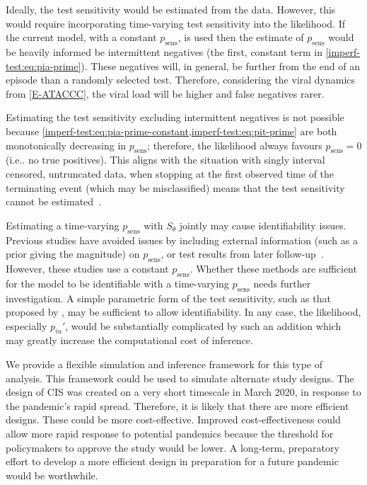 \documentclass[12pt]{article}
\makeatletter
\newcommand{\psens}{p_\text{sens}}
\DeclareRobustCommand\onedot{\futurelet\@let@token\@onedot}
\def\@onedot{\ifx\@let@token.\else.\null\fi\xspace}
\def\ie{i.e\onedot} \def\Ie{{I.e}\onedot}
\makeatother
\begin{document}
Ideally, the test sensitivity would be estimated from the data.
However, this would require incorporating time-varying test sensitivity into the likelihood.
If the current model, with a constant $\psens$, is used then the estimate of $\psens$ would be heavily informed be intermittent negatives (the first, constant term in \cref{imperf-test:eq:pia-prime}).
These negatives will, in general, be further from the end of an episode than a randomly selected test.
Therefore, considering the viral dynamics from \cref{E-ATACCC}, the viral load will be higher and false negatives rarer.

Estimating the test sensitivity excluding intermittent negatives is not possible because \cref{imperf-test:eq:pia-prime-constant,imperf-test:eq:pit-prime} are both monotonically decreasing in $\psens$; therefore, the likelihood always favours $\psens = 0$ (\ie no true positives).
This aligns with the situation with singly interval censored, untruncated data, when stopping at the first observed time of the terminating event (which may be misclassified) means that the test sensitivity cannot be estimated~\citep[e.g.]{titmanMisclassify}.

Estimating a time-varying $\psens$ with $S_\theta$ jointly may cause identifiability issues.
Previous studies have avoided issues by including external information (such as a prior giving the magnitude) on $\psens$, or test results from later follow-up~\citep[and references therein]{piresIntervalMisclassify}.
However, these studies use a constant $\psens$.
Whether these methods are sufficient for the model to be identifiable with a time-varying $\psens$ needs further investigation.
A simple parametric form of the test sensitivity, such as that proposed by \citet{brownBayesian}, may be sufficient to allow identifiability.
In any case, the likelihood, especially $p_{iu}'$, would be substantially complicated by such an addition which may greatly increase the computational cost of inference.

We provide a flexible simulation and inference framework for this type of analysis.
This framework could be used to simulate alternate study designs.
The design of CIS was created on a very short timescale in March 2020, in response to the pandemic's rapid spread.
Therefore, it is likely that there are more efficient designs.
These could be more cost-effective.
Improved cost-effectiveness could allow more rapid response to potential pandemics because the threshold for policymakers to approve the study would be lower.
A long-term, preparatory effort to develop a more efficient design in preparation for a future pandemic would be worthwhile.
\end{document}
